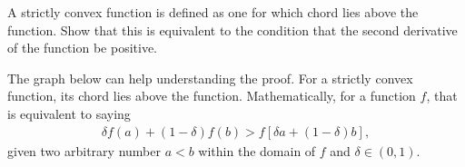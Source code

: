 \begin{question}{1.36}
	A strictly convex function is defined as one for which chord lies above the function. Show that this is equivalent to the condition that the second derivative of the function be positive.
\end{question}

\begin{answer}{}
	The graph below can help understanding the proof. For a strictly convex function, its chord lies above the function. Mathematically, for a function $f$, that is equivalent to saying
	\begin{align}\label{1.36eqn1}
		\delta f(a) + (1-\delta) f(b) > f\left[ \delta a + (1-\delta)b \right],
	\end{align}
	given two arbitrary number $a < b$ within the domain of $f$ and $\delta \in (0, 1)$. 
	\begin{figure*}[h]
		\centering
	\end{figure*}


\end{answer}
